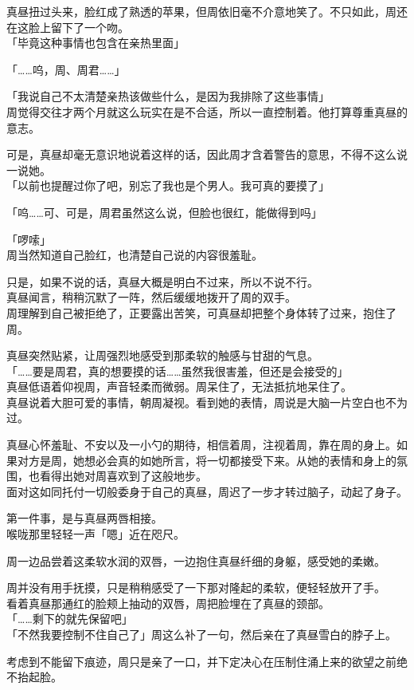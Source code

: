 真昼扭过头来，脸红成了熟透的苹果，但周依旧毫不介意地笑了。不只如此，周还在这脸上留下了一个吻。\\

「毕竟这种事情也包含在亲热里面」

「……呜，周、周君……」

「我说自己不太清楚亲热该做些什么，是因为我排除了这些事情」\\

周觉得交往才两个月就这么玩实在是不合适，所以一直控制着。他打算尊重真昼的意志。

可是，真昼却毫无意识地说着这样的话，因此周才含着警告的意思，不得不这么说一说她。\\

「以前也提醒过你了吧，别忘了我也是个男人。我可真的要摸了」

「呜……可、可是，周君虽然这么说，但脸也很红，能做得到吗」

「啰嗦」\\

周当然知道自己脸红，也清楚自己说的内容很羞耻。

只是，如果不说的话，真昼大概是明白不过来，所以不说不行。\\

真昼闻言，稍稍沉默了一阵，然后缓缓地拨开了周的双手。\\

周理解到自己被拒绝了，正要露出苦笑，可真昼却把整个身体转了过来，抱住了周。

真昼突然贴紧，让周强烈地感受到那柔软的触感与甘甜的气息。\\

「……要是周君，真的想要摸的话……虽然我很害羞，但还是会接受的」\\

真昼低语着仰视周，声音轻柔而微弱。周呆住了，无法抵抗地呆住了。\\

真昼说着大胆可爱的事情，朝周凝视。看到她的表情，周说是大脑一片空白也不为过。

真昼心怀羞耻、不安以及一小勺的期待，相信着周，注视着周，靠在周的身上。如果对方是周，她想必会真的如她所言，将一切都接受下来。从她的表情和身上的氛围，也看得出她对周喜欢到了这般地步。\\

面对这如同托付一切般委身于自己的真昼，周迟了一步才转过脑子，动起了身子。

第一件事，是与真昼两唇相接。\\

喉咙那里轻轻一声「嗯」近在咫尺。

周一边品尝着这柔软水润的双唇，一边抱住真昼纤细的身躯，感受她的柔嫩。

周并没有用手抚摸，只是稍稍感受了一下那对隆起的柔软，便轻轻放开了手。\\

看着真昼那通红的脸颊上抽动的双唇，周把脸埋在了真昼的颈部。\\

「……剩下的就先保留吧」\\

「不然我要控制不住自己了」周这么补了一句，然后亲在了真昼雪白的脖子上。

考虑到不能留下痕迹，周只是亲了一口，并下定决心在压制住涌上来的欲望之前绝不抬起脸。
